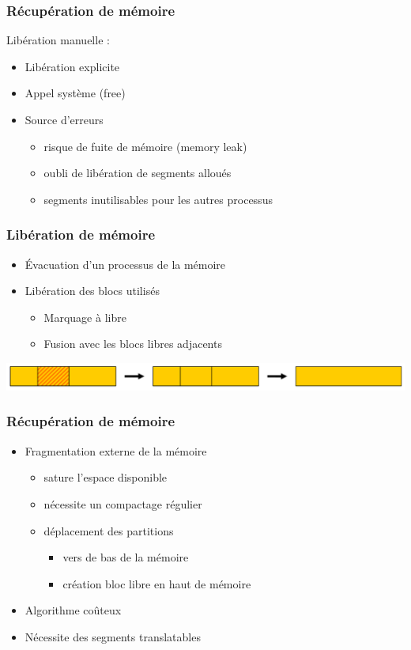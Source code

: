 \begin{frame}
\frametitle{Récupération de mémoire}
Libération manuelle :
\begin{itemize}
  \item Libération explicite
  \item Appel système (free)
  \item Source d’erreurs
  \begin{itemize}
    \item risque de fuite de mémoire (memory leak)
    \item oubli de libération de segments alloués
    \item segments inutilisables pour les autres processus
  \end{itemize}
\end{itemize}
\end{frame}


\begin{frame}
\frametitle{Libération de mémoire}
\begin{itemize}
  \item Évacuation d'un processus de la mémoire
  \item Libération des blocs utilisés
  \begin{itemize}
    \item Marquage à libre
    \item Fusion avec les blocs libres adjacents
  \end{itemize}
\end{itemize}
\includegraphics[width=\textwidth]{../illustration/memoire_principale_liberation_bloc.pdf}
\end{frame}


\begin{frame}
\frametitle{Récupération de mémoire}
\begin{itemize}
  \item Fragmentation externe de la mémoire
  \begin{itemize}
    \item sature l’espace disponible
    \item nécessite un compactage régulier
    \item déplacement des partitions
    \begin{itemize}
      \item vers de bas de la mémoire
      \item création bloc libre en haut de mémoire
    \end{itemize}
  \end{itemize}
  \item Algorithme coûteux
  \item Nécessite des segments translatables
\end{itemize}
\end{frame}

